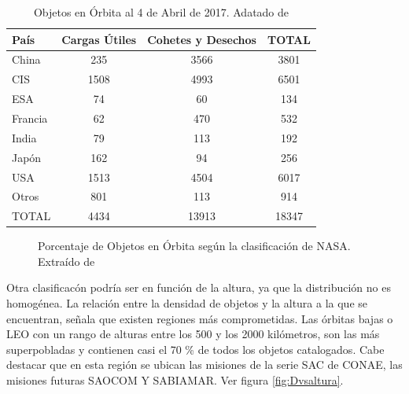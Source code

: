 \begin{table}
 \centering
 \begin{tabular}{|l|c|c|c|}
  \hline \hline
  \rowcolor{lightgray}
  \bf{Pa\'is}  &    \bf{Cargas \'Utiles} & \bf{Cohetes y Desechos} & TOTAL\\
  \hline \hline
  China & 235 & 3566&3801\\
  \hline
  CIS & 1508&4993&6501\\
  \hline
  ESA &74&60&134\\
  \hline
  Francia & 62&470&532\\
  \hline
  India & 79 & 113 & 192\\
  \hline
  Jap\'on & 162 & 94 & 256\\
  \hline
  USA & 1513 & 4504 & 6017\\
  \hline
  Otros & 801 & 113 & 914 \\
  \hline\hline
  \rowcolor{lightgray}
  TOTAL & 4434 & 13913 & 18347 \\
  \hline\hline
 \end{tabular}
 \caption[Objetos en \'Orbita al 4 de Abril de 2017.]{Objetos en \'Orbita al 4 de Abril de 2017. Adatado de \cite{ODQN}}
 \label{tab:objpais}
\end{table}

\begin{figure}[!h]
\centering
    \caption[Objetos en \'Orbita seg\'un NASA.]{Porcentaje de Objetos en \'Orbita seg\'un la clasificaci\'on de NASA. Extra\'ido de \cite{ODQN}}
    \label{fig:catxtipo}
\end{figure}

Otra clasificac\'on podr\'ia ser en funci\'on de la altura, ya que la distribuci\'on no es homog\'enea. La relaci\'on entre la densidad de objetos y la altura a la que se encuentran, señala que existen regiones m\'as comprometidas.
Las \'orbitas bajas o \ac{LEO} con un rango de alturas entre los 500 y los 2000 kil\'ometros, son las m\'as superpobladas y contienen casi el 70 \% de todos los objetos catalogados. 
Cabe destacar que en esta regi\'on se ubican las misiones de la serie SAC de CONAE, las misiones futuras SAOCOM Y SABIAMAR. Ver figura \ref{fig:Dvsaltura}.\\

